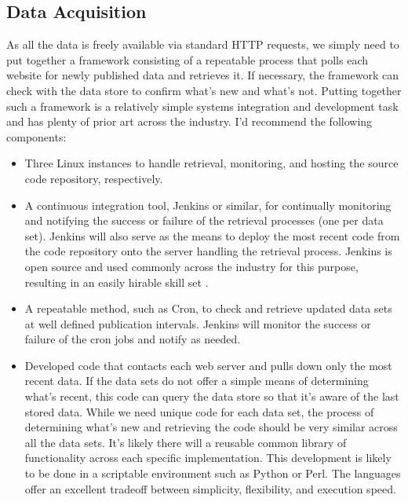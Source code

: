 \subsection{Data Acquisition}
As all the data is freely available via standard HTTP requests, we simply need to put together a framework consisting of a repeatable process that polls each website for newly published data and retrieves it. If necessary, the framework can check with the data store to confirm what's new and what's not. Putting together such a framework is a relatively simple systems integration and development task and has plenty of prior art across the industry. I'd recommend the following components:
\begin{itemize}
	\item Three Linux instances to handle retrieval, monitoring, and hosting the source code repository, respectively.
	\item A continuous integration tool, Jenkins or similar, for continually monitoring and notifying the success or failure of the retrieval processes (one per data set). Jenkins will also serve as the means to deploy the most recent code from the code repository onto the server handling the retrieval process. Jenkins is open source and used commonly across the industry for this purpose, resulting in an easily hirable skill set \cite{jenkins}.
	\item A repeatable method, such as Cron, to check and retrieve updated data sets at well defined publication intervals. Jenkins will monitor the success or failure of the cron jobs and notify as needed.
	\item Developed code that contacts each web server and pulls down only the most recent data. If the data sets do not offer a simple means of determining what's recent, this code can query the data store so that it's aware of the last stored data. While we need unique code for each data set, the process of determining what's new and retrieving the code should be very similar across all the data sets. It's likely there will a reusable common library of functionality across each specific implementation. This development is likely to be done in a scriptable environment such as Python or Perl. The languages offer an excellent tradeoff between simplicity, flexibility, and execution speed.
\end{itemize}

